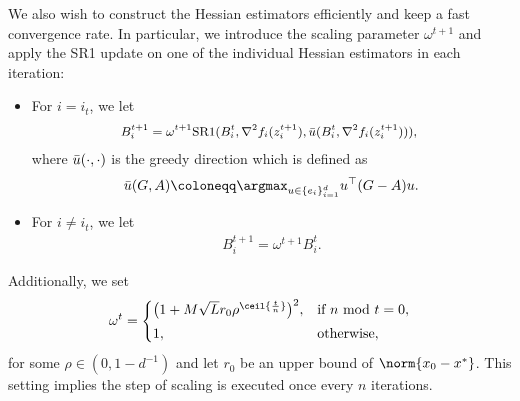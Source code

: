 We also wish to construct the Hessian estimators efficiently and keep a fast convergence rate.
In particular, we introduce the scaling parameter $\omega^{t+1}$ and apply the SR1 update on one of the individual Hessian estimators in each iteration:
\begin{itemize}
\item For $i=i_t$, we let
\begin{equation}\label{greedy_sr1_update-0}
\small\begin{split}    
    \!\!\!B_{i}^{t+1} = \omega^{t+1} \textrm{SR1}(B_{i}^{t}, \nabla^2 f_{i}(z_{i}^{t+1}), \Bar{u}(B_{i}^{t}, \nabla^2 f_{i}(z_{i}^{t+1}))), 
\end{split}
\end{equation}
where $\Bar u(\cdot,\cdot)$ is the greedy direction which is defined as
\begin{align}\label{sr_greedy_vec}    
\Bar{u}(G, A) 
\coloneqq\argmax_{u \in \{ e_i \}_{i=1}^d } u^{\top} (G-A) u.
\end{align}
\item For $i\neq i_t$, we let
\begin{equation}\label{greedy_sr1_update-1}
\begin{split}    
    B_{i}^{t+1} = \omega^{t+1} B_{i}^{t}. 
\end{split}
\end{equation}
\end{itemize}
Additionally, we set 
\begin{align}\label{greedy_sr1_omega}
\omega^t = \begin{cases}
\big(1 + M \sqrt{L}r_0 \rho^{\ceil{\frac{t}{n}}}\big)^2,   & \text{if}~n~{\rm mod}~t = 0, \\[0.1cm] 
1, & \text{otherwise}, 
\end{cases}    
\end{align}
for some $\rho\in(0,1-d^{-1})$ and let $r_0$ be an upper bound of $\norm{x_0-x^*}$.
This setting implies the step of scaling is executed once every $n$ iterations. 

